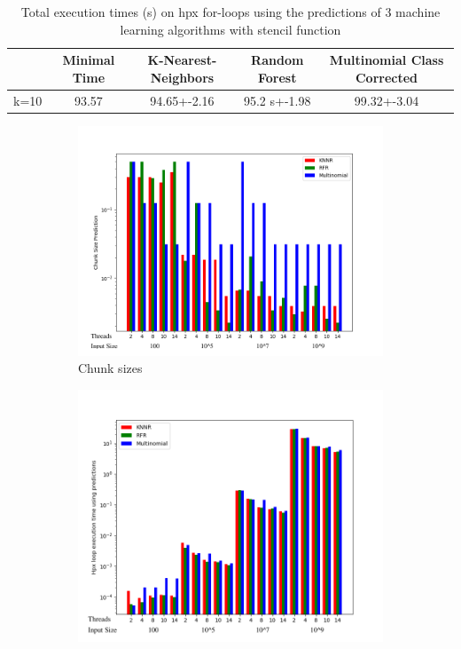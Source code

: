 \begin{table}[h]
	\centering
	\caption{Total execution times (s) on hpx for-loops using the predictions of 3 machine learning algorithms with stencil function}
	\label{my-label}
	\begin{tabular}{|c|c|c|c|c|}
		\hline
		& Minimal Time &K-Nearest-Neighbors & Random Forest &Multinomial Class Corrected\\ \hline
		k=10 & 93.57&94.65+-2.16  & 95.2 s+-1.98 & 99.32+-3.04\\ \hline
	\end{tabular}
\end{table}
\begin{figure}[h]
	\centering
	\begin{subfigure}[b]{0.5\textwidth}
		\centering
		\includegraphics[width=\textwidth]{images/stencil_predictions_bars.png}
		\caption[Network2]%
		{{Chunk sizes}}    
	\end{subfigure}
	\hfill
	\begin{subfigure}[b]{0.49\textwidth}  
		\centering 
		\includegraphics[width=\textwidth]{images/stencil_times_bars.png}

\end{subfigure}
\end{figure}
